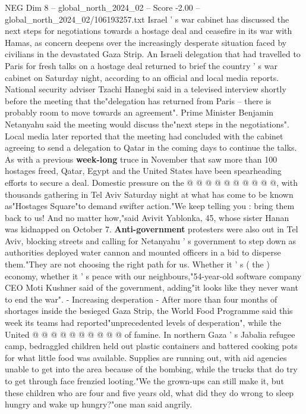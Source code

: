 \begin{textsample}{NEG Dim 8 – global\_north\_2024\_02 – Score -2.00 – global\_north\_2024\_02/106193257.txt}  \label{ex:f8_neg_230}
Israel ' s war cabinet has discussed the next steps for negotiations towards a hostage deal and ceasefire in its war with Hamas, as concern deepens over the increasingly desperate situation faced by civilians in the devastated Gaza Strip.
An Israeli delegation that had travelled to Paris for fresh talks on a hostage deal returned to brief the country ' s war cabinet on Saturday night, according to an official and local media reports.
National security adviser Tzachi Hanegbi said in a televised interview shortly before the meeting that the"delegation has returned from Paris -- there is probably room to move towards an agreement".
Prime Minister Benjamin Netanyahu said the meeting would discuss the"next steps in the negotiations".
Local media later reported that the meeting had concluded with the cabinet agreeing to send a delegation to Qatar in the coming days to continue the talks.
As with a previous \textbf{week-long} truce in November that saw more than 100 hostages freed, Qatar, Egypt and the United States have been spearheading efforts to secure a deal.
Domestic pressure on the @ @ @ @ @ @ @ @ @ @, with thousands gathering in Tel Aviv Saturday night at what has come to be known as"Hostages Square"to demand swifter action."We keep telling you : bring them back to us!
And no matter how,"said Avivit Yablonka, 45, whose sister Hanan was kidnapped on October 7. \textbf{Anti-government} protesters were also out in Tel Aviv, blocking streets and calling for Netanyahu ' s government to step down as authorities deployed water cannon and mounted officers in a bid to disperse them."They are not choosing the right path for us.
Whether it ' s ( the ) economy, whether it ' s peace with our neighbours,"54-year-old software company CEO Moti Kushner said of the government, adding"it looks like they never want to end the war". - Increasing desperation - After more than four months of shortages inside the besieged Gaza Strip, the World Food Programme said this week its teams had reported"unprecedented levels of desperation", while the United @ @ @ @ @ @ @ @ @ @ of famine.
In northern Gaza ' s Jabalia refugee camp, bedraggled children held out plastic containers and battered cooking pots for what little food was available.
Supplies are running out, with aid agencies unable to get into the area because of the bombing, while the trucks that do try to get through face frenzied looting."We the grown-ups can still make it, but these children who are four and five years old, what did they do wrong to sleep hungry and wake up hungry?"one man said angrily.

\end{textsample}
